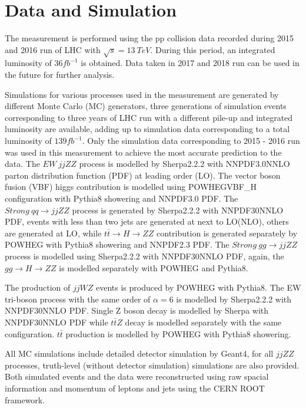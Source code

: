 \documentclass[12pt]{article}
\begin{document}
    \section{Data and Simulation}
        \par The measurement is performed using the pp collision data recorded during 2015 and 2016 run of LHC 
        with $\sqrt{s} = 13\ TeV$. During this period, an integrated luminosity of $36fb^{-1}$ is obtained. 
        Data taken in 2017 and 2018 run can be used in the future for further analysis.
        \par Simulations for various processes used in the measurement are generated by different Monte Carlo (MC) generators\cite{weinzierl2000introduction}\cite{Buckley2019MonteCE}, 
        three generations of simulation events corresponding to three years of LHC run with a different pile-up and integrated 
        luminosity are available, adding up to simulation data corresponding to a total luminosity of $139fb^{-1}$. 
        Only the simulation data corresponding to 2015 - 2016 run was used in this measurement to achieve the most accurate prediction to the data. 
        The $EW\ jjZZ$ process is modelled by Sherpa2.2.2\cite{0811.4622} with NNPDF3.0NNLO\cite{1405.0301} parton 
        distribution function (PDF) at leading order (LO). The vector boson fusion (VBF) higgs contribution is 
        modelled using POWHEGVBF\_H\cite{0911.5299} configuration with Pythia8\cite{1410.3012} showering and NNPDF3.0 
        PDF. The $Strong\ qq \rightarrow jjZZ$ process is generated by Sherpa2.2.2 with NNPDF30NNLO PDF, events with 
        less than two jets are generated at next to LO(NLO), others are generated at LO, while $t\bar{t}\rightarrow {H} \rightarrow ZZ$ 
        contribution is generated separately by POWHEG\cite{1007.3893} with Pythia8 showering and NNPDF2.3 PDF. The
         $Strong\ gg \rightarrow jjZZ$ process is modelled using Sherpa2.2.2 with NNPDF30NNLO PDF, again, the $gg\rightarrow {H}\rightarrow ZZ$ 
         is modelled separately with POWHEG and Pythia8.
        \par The production of $jjWZ$ events is produced by POWHEG with Pythia8. The EW tri-boson process with the same order of $\alpha=6$ is modelled by Sherpa2.2.2 with NNPDF30NNLO PDF. Single Z boson decay is modelled by Sherpa with NNPDF30NNLO PDF while $t\bar{t}Z$ decay is modelled separately with the same configuration. $t\bar{t}$ production is modelled by POWHEG with Pythia8 showering.
        \par All MC simulations include detailed detector simulation by Geant4\cite{AGOSTINELLI2003250}, for all $jjZZ$ processes, truth-level (without detector simulation) simulations are also provided. Both simulated events and the data were reconstructed using raw spacial information and momentum of leptons and jets using the CERN ROOT\cite{ANTCHEVA20092499} framework.
\end{document}
